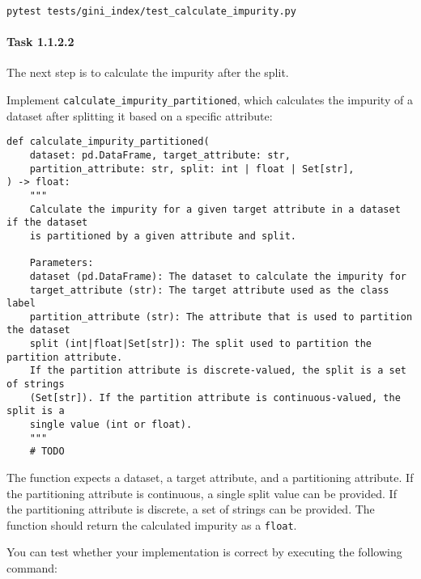 \documentclass[
english,
smallborders
]{i6prcsht}
\begin{document}
\begin{lstlisting}
pytest tests/gini_index/test_calculate_impurity.py
\end{lstlisting}

\vspace*{0.1cm}

\paragraph*{Task 1.1.2.2} \hfill

The next step is to calculate the impurity after the split.

Implement \texttt{calculate\_impurity\_partitioned}, which calculates the impurity of a dataset after splitting it based on a specific attribute:

\vspace*{0.3cm}

\newpage

\begin{lstlisting}
def calculate_impurity_partitioned(
	dataset: pd.DataFrame, target_attribute: str,
	partition_attribute: str, split: int | float | Set[str],
) -> float:
	"""
	Calculate the impurity for a given target attribute in a dataset if the dataset
	is partitioned by a given attribute and split.

	Parameters:
	dataset (pd.DataFrame): The dataset to calculate the impurity for
	target_attribute (str): The target attribute used as the class label
	partition_attribute (str): The attribute that is used to partition the dataset
	split (int|float|Set[str]): The split used to partition the partition attribute.
	If the partition attribute is discrete-valued, the split is a set of strings
	(Set[str]). If the partition attribute is continuous-valued, the split is a
	single value (int or float).
	"""
	# TODO
\end{lstlisting}

\vspace*{0.1cm}

The function expects a dataset, a target attribute, and a partitioning attribute. If the partitioning attribute is continuous, a single split value can be provided. If the partitioning attribute is discrete, a set of strings can be provided. The function should return the calculated impurity as a \texttt{float}.

You can test whether your implementation is correct by executing the following command:

\vspace*{0.3cm}
\end{document}
